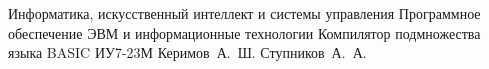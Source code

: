 \documentclass{bmstu-gost-7-32}
\begin{document}
\makecourseworktitle
	{Информатика, искусственный интеллект и системы управления} %
	{Программное обеспечение ЭВМ и информационные технологии} %
	{Компилятор подмножества языка BASIC} %
	{ИУ7-23М} %
	{Керимов~А.~Ш.} %
	{Ступников~А.~А.} %
	{} %
	{} %

%
%
%

%
%


\begin{MainPart}
	
	
	
\end{MainPart}



%
\end{document}
